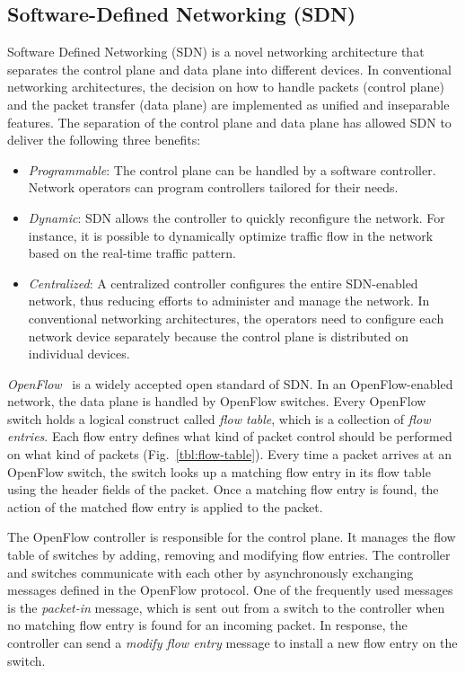 \subsection{Software-Defined Networking (SDN)}

Software Defined Networking (SDN) is a novel networking architecture
that separates the control plane and data plane into different devices.
In conventional networking architectures, the decision on how to handle
packets (control plane) and the packet transfer (data plane) are
implemented as unified and inseparable features. The separation of the
control plane and data plane has allowed SDN to deliver the following
three benefits:

\begin{itemize}
\item
  \emph{Programmable}: The control plane can be handled by a software
  controller. Network operators can program controllers tailored for
  their needs.
\item
  \emph{Dynamic}: SDN allows the controller to quickly reconfigure the
  network. For instance, it is possible to dynamically optimize traffic
  flow in the network based on the real-time traffic pattern.
\item
  \emph{Centralized}: A centralized controller configures the entire
  SDN-enabled network, thus reducing efforts to administer and manage
  the network. In conventional networking architectures, the operators
  need to configure each network device separately because the control
  plane is distributed on individual devices.
\end{itemize}

\emph{OpenFlow}~\autocite{McKeown2008} is a widely accepted open
standard of SDN\@. In an OpenFlow-enabled network, the data plane is
handled by OpenFlow switches. Every OpenFlow switch holds a logical
construct called \emph{flow table}, which is a collection of \emph{flow
entries}. Each flow entry defines what kind of packet control should be
performed on what kind of packets (Fig.~\ref{tbl:flow-table}). Every
time a packet arrives at an OpenFlow switch, the switch looks up a
matching flow entry in its flow table using the header fields of the
packet. Once a matching flow entry is found, the action of the matched
flow entry is applied to the packet.

The OpenFlow controller is responsible for the control plane. It manages
the flow table of switches by adding, removing and modifying flow
entries. The controller and switches communicate with each other by
asynchronously exchanging messages defined in the OpenFlow protocol. One
of the frequently used messages is the \emph{packet-in} message, which
is sent out from a switch to the controller when no matching flow entry
is found for an incoming packet. In response, the controller can send a
\emph{modify flow entry} message to install a new flow entry on the
switch.

